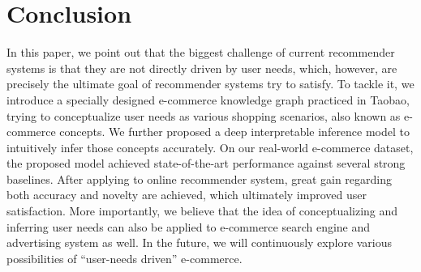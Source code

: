 \section{Conclusion}
\label{sec:conclusion}

In this paper,
we point out that the biggest challenge of current recommender systems
is that they are not directly driven by user needs, 
which, however, are precisely the ultimate goal of recommender systems try to satisfy.
To tackle it, we introduce a specially designed e-commerce knowledge graph practiced in Taobao, trying to conceptualize user needs as various shopping scenarios, also known as e-commerce concepts. 
We further proposed a deep interpretable inference model to intuitively infer those concepts accurately.
On our real-world e-commerce dataset, the proposed model achieved state-of-the-art performance against several strong baselines.
After applying to online recommender system, great gain regarding both accuracy and novelty are achieved, which ultimately improved user satisfaction.
More importantly, we believe that the idea of conceptualizing and inferring user needs can also be applied to e-commerce search engine and advertising system as well. In the future, we will continuously explore various possibilities of ``user-needs driven'' e-commerce.